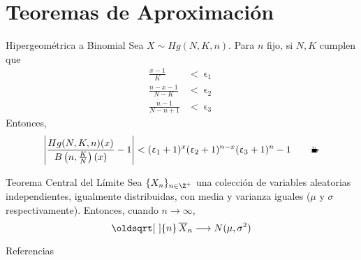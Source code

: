 \documentclass[10pt]{beamer}
\renewcommand*{\sqrt}[2][\ ]{\oldsqrt[#1]{#2}}
\renewcommand{\epsilon}{\upvarepsilon}
\begin{document}
\section{Teoremas de Aproximación}
\begin{frame}{Hipergeométrica a Binomial}
  Sea $X\sim Hg(N,K,n)$. Para $n$ fijo, si $N,K$ cumplen que
  \begin{align*}
    \frac{x-1}{K}         &< \epsilon_1\\
    \frac{n-x-1}{N-K}     &< \epsilon_2\\
    \frac{n-1}{N - n + 1} &< \epsilon_3
  \end{align*}
  Entonces,
  \[
    \left|\dfrac{Hg(N,K,n)(x)}{B\left(n,\frac{K}{N}\right)(x)} - 1\right| 
    < (\epsilon_1 + 1)^{x}(\epsilon_2 + 1)^{n-x}(\epsilon_3 + 1)^{n} - 1
    \qquad\text{\Coffeecup}
  \]
\end{frame}
\begin{frame}{Teorema Central del Límite}
  Sea $\{X_n\}_{n\in\Z^+}$ una colección de variables aleatorias independientes,
  igualmente distribuidas, con media y varianza iguales ($\mu$ y $\sigma$
  respectivamente). Entonces, cuando $n\longrightarrow\infty$,
  \[\sqrt{n}\,\overline{X}_n\longrightarrow N(\mu,\sigma^2)\]
\end{frame}
\begin{frame}{Referencias}
  \nocite{*}
  \printbibliography
\end{frame}
\end{document}
